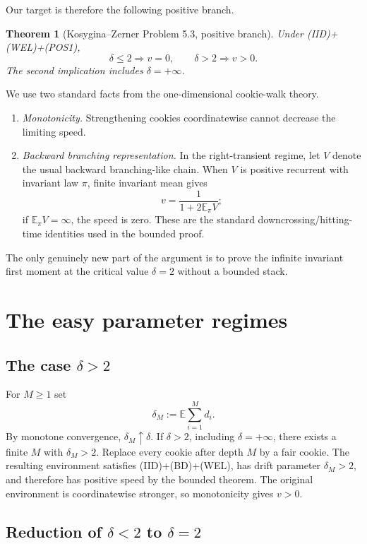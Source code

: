\documentclass[11pt]{article}
\newtheorem{theorem}{Theorem}[section]
\newcommand{\E}{\mathbb E}
\begin{document}
Our target is therefore the following positive branch.

\begin{theorem}[Kosygina--Zerner Problem 5.3, positive branch]\label{thm:main}
Under \emph{(IID)+(WEL)+(POS1)},
\[
 \delta\le2 \Longrightarrow v=0,
 \qquad
 \delta>2 \Longrightarrow v>0.
\]
The second implication includes $\delta=+\infty$.
\end{theorem}

We use two standard facts from the one-dimensional cookie-walk theory.

\begin{enumerate}
\item \emph{Monotonicity.} Strengthening cookies coordinatewise cannot decrease the limiting speed.
\item \emph{Backward branching representation.} In the right-transient regime, let $V$ denote the usual backward branching-like chain.  When $V$ is positive recurrent with invariant law $\pi$, finite invariant mean gives
\[
 v=\frac{1}{1+2\E_\pi V};
\]
if $\E_\pi V=\infty$, the speed is zero.  These are the standard downcrossing/hitting-time identities used in the bounded proof.
\end{enumerate}

The only genuinely new part of the argument is to prove the infinite invariant first moment at the critical value $\delta=2$ without a bounded stack.

\section{The easy parameter regimes}

\subsection{The case $\delta>2$}

For $M\ge1$ set
\[
 \delta_M:=\E\sum_{i=1}^{M}d_i.
\]
By monotone convergence, $\delta_M\uparrow\delta$.  If $\delta>2$, including $\delta=+\infty$, there exists a finite $M$ with $\delta_M>2$.  Replace every cookie after depth $M$ by a fair cookie.  The resulting environment satisfies (IID)+(BD)+(WEL), has drift parameter $\delta_M>2$, and therefore has positive speed by the bounded theorem.  The original environment is coordinatewise stronger, so monotonicity gives $v>0$.

\subsection{Reduction of $\delta<2$ to $\delta=2$}
\end{document}
